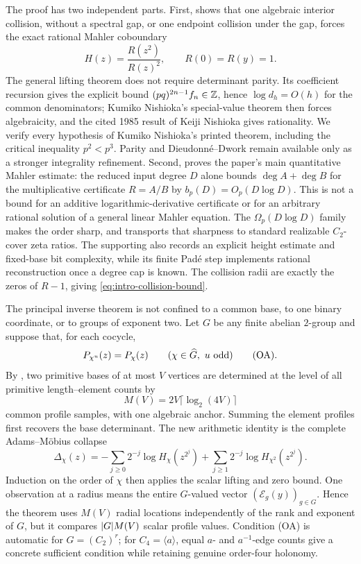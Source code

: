 The proof has two independent parts.  First,
 shows that one algebraic interior
collision, without a spectral gap, or one endpoint collision under the gap,
forces the exact rational Mahler coboundary
\[
 H(z)=\frac{R(z^2)}{R(z)^2},\qquad R(0)=R(y)=1.
\]
The general lifting theorem does not require determinant parity.  Its
coefficient recursion gives the explicit bound
\((pq)^{2n-1}f_n\in\mathbb{Z}\), hence \(\log d_h=O(h)\) for the common
denominators; Kumiko Nishioka's special-value theorem then forces algebraicity,
and the cited 1985 result of Keiji Nishioka gives rationality.  We verify every
hypothesis of Kumiko Nishioka's printed theorem, including the critical
inequality \(p^2<p^3\).  Parity and Dieudonn\'e--Dwork remain available only
as a stronger integrality refinement.  Second,
 proves the paper's main
quantitative Mahler estimate: the reduced input degree \(D\) alone bounds
\(\deg A+\deg B\) for the multiplicative certificate \(R=A/B\) by
\(b_p(D)=O_p(D\log D)\).  This is not a bound for an additive
logarithmic-derivative certificate or for an arbitrary rational solution of a
general linear Mahler equation.  The \(\Omega_p(D\log D)\) family makes the
order sharp, and 
transports that sharpness to standard realizable \(C_2\)-cover zeta ratios.
The supporting  also records
an explicit height estimate and fixed-base bit complexity, while its finite
Pad\'e step implements rational reconstruction once a degree cap is known.
The collision radii are exactly the zeros of
\(R-1\), giving
\eqref{eq:intro-collision-bound}.

The principal inverse theorem is not confined to a common base, to one binary
coordinate, or to groups of exponent two.  Let \(G\) be any finite abelian
\(2\)-group and suppose that, for each cocycle,
\[
 P_{\chi^u}(z)=P_\chi(z)
 \qquad(\chi\in\widehat G,\ u\ {\rm odd})\qquad\text{\rm(OA)}.
\]
By , two primitive
bases of at most \(V\) vertices are determined at the level of all primitive
length--element counts by
\[
 M(V)=2V\lceil\log_2(4V)\rceil
\]
common profile samples, with one algebraic anchor.  Summing the element
profiles first recovers the base determinant.  The new arithmetic identity is
the complete Adams--M\"obius collapse
\[
 \Delta_\chi(z)
 =-\sum_{j\ge0}2^{-j}\log H_\chi(z^{2^j})
  +\sum_{j\ge1}2^{-j}\log H_{\chi^2}(z^{2^j}).
\]
Induction on the order of \(\chi\) then applies the scalar lifting and zero
bound.  One observation at a radius means the entire \(G\)-valued vector
\((\mathcal E_g(y))_{g\in G}\).  Hence the theorem uses \(M(V)\)
radial locations independently of the rank and exponent of \(G\), but it
compares \(\lvert G \rvert M(V)\) scalar profile values.  Condition (OA) is automatic
for \(G=(C_2)^r\); for \(C_4=\langle a\rangle\), equal \(a\)- and
\(a^{-1}\)-edge counts give a concrete sufficient condition while retaining
genuine order-four holonomy.

